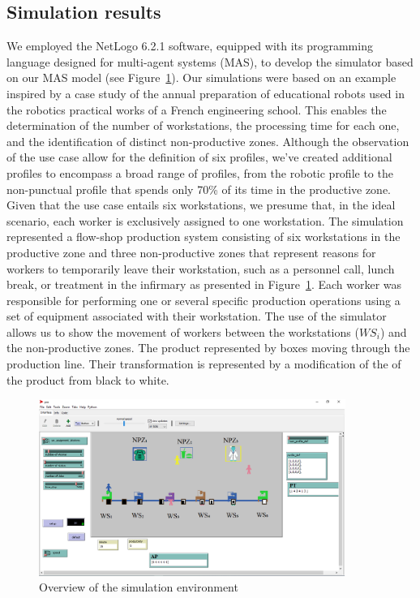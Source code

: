 \documentclass[review,12pt, 3p, times]{elsarticle}
\begin{document}
\subsection{Simulation results}
We employed the NetLogo 6.2.1 software, equipped with its programming language designed for multi-agent systems (MAS), to develop the simulator based on our MAS model (see Figure~\ref{fig:simulator}). Our simulations were based on an example inspired by a case study of the annual preparation of educational robots used in the robotics practical works of a French engineering school. This enables the determination of the number of workstations, the processing time for each one, and the identification of distinct non-productive zones. Although the observation of the use case  allow for the definition of six profiles, we've created additional profiles to encompass a broad range of profiles, from the robotic profile to the non-punctual profile that spends only 70\% of its time in the productive zone. Given that the use case entails six workstations, we presume that, in the ideal scenario, each worker is exclusively assigned to one workstation. The simulation represented a  flow-shop production system consisting of six workstations in the productive zone and three non-productive zones that represent reasons for workers to temporarily leave their workstation, such as a personnel call, lunch break, or treatment in the infirmary as presented in Figure~\ref{fig:simulator}. Each worker was responsible for performing one or several specific production operations using a set of equipment associated with their workstation. The use of the simulator allows us to show the movement of workers  between the workstations ($WS_i$) and the non-productive zones. The product  represented by boxes moving through the production line. Their transformation is represented by a modification of the  of the product from black to white.
\begin{figure}[htbp]
	\centering
	\includegraphics[width=10cm]{simulation.png}
	\caption{Overview of the simulation environment}
	\label{fig:simulator}
\end{figure}
		
\end{document}
